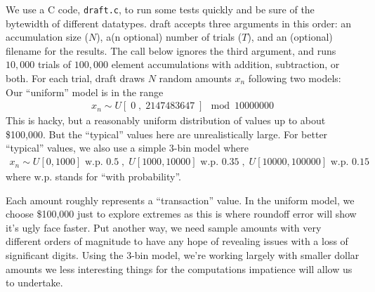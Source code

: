 \documentclass[11pt, oneside]{amsart}   	%
\begin{document}
We use a C code, \texttt{draft.c}, to run some tests quickly and be sure of the bytewidth of different datatypes. draft  accepts three arguments in this order: an accumulation size ($N$), a(n optional) number of trials ($T$), and an (optional) filename for the results. The call below ignores the third argument, and runs $10,000$ trials of $100,000$ element accumulations with addition, subtraction, or both. For each trial, draft draws $N$ random amounts $x_n$ following two models: Our ``uniform'' model is in the range 
\begin{align*}
    x_n \sim U[\; 0 \; , \; 2147483647 \; ] \mod 10000000
\end{align*}
This is hacky, but a reasonably uniform distribution of values up to about \$100,000. But the ``typical'' values here are unrealistically large. For better ``typical'' values, we also use a simple 3-bin model where 
\begin{align*}
    x_n \sim U[0,1000] \text{ w.p. } 0.5 \; , \; U[1000,10000] \text{ w.p. } 0.35 \; , \; U[10000,100000] \text{ w.p. } 0.15
\end{align*}
where $\text{w.p.}$ stands for ``with probability''. 

Each amount roughly represents a ``transaction'' value. In the uniform model, we choose \$100,000 just to explore extremes as this is where roundoff error will show it's ugly face faster. Put another way, we need sample amounts with very different orders of magnitude to have any hope of revealing issues with a loss of significant digits. Using the 3-bin model, we're working largely with smaller dollar amounts we less interesting things for the computations impatience will allow us to undertake. 
\end{document}
